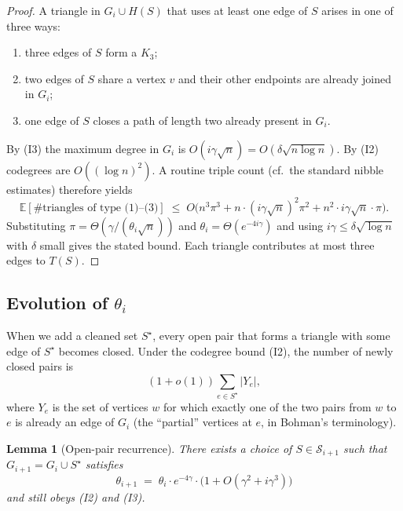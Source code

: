 \documentclass[11pt]{article}
\newtheorem{lemma}[theorem]{Lemma}
\theoremstyle{definition}
\begin{document}
\begin{proof}
A triangle in $G_i\cup H(S)$ that uses at least one edge of $S$ arises in one of three ways:
\begin{enumerate}
  \item three edges of $S$ form a $K_3$;
  \item two edges of $S$ share a vertex $v$ and their other endpoints are already joined in $G_i$;
  \item one edge of $S$ closes a path of length two already present in $G_i$.
\end{enumerate}
By (I3) the maximum degree in $G_i$ is $O(i\gamma\sqrt{n})=O(\delta\sqrt{n\log n})$.
By (I2) codegrees are $O((\log n)^{2})$.
A routine triple count (cf.\ the standard nibble estimates) therefore yields
\[
  \mathbb{E}[\text{\# triangles of type (1)--(3)}]
  \;\le\;
  O\bigl( n^{3}\pi^{3} + n\cdot (i\gamma\sqrt{n})^{2}\pi^{2} + n^{2}\cdot i\gamma\sqrt{n}\cdot\pi \bigr).
\]
Substituting $\pi=\Theta(\gamma/(\theta_i\sqrt{n}))$ and $\theta_i=\Theta(e^{-4i\gamma})$ and using $i\gamma\le\delta\sqrt{\log n}$ with $\delta$ small gives the stated bound.
Each triangle contributes at most three edges to $T(S)$.
\end{proof}

\subsection{Evolution of $\theta_i$}

When we add a cleaned set $S^\star$, every open pair that forms a triangle with some edge of $S^\star$ becomes closed.
Under the codegree bound (I2), the number of newly closed pairs is
\[
  (1+o(1))\sum_{e\in S^\star} |Y_e|,
\]
where $Y_e$ is the set of vertices $w$ for which exactly one of the two pairs from $w$ to $e$ is already an edge of $G_i$ (the ``partial'' vertices at $e$, in Bohman's terminology).

\begin{lemma}[Open-pair recurrence]\label{lem:theta}
There exists a choice of $S\in\mathcal{S}_{i+1}$ such that $G_{i+1}=G_i\cup S^\star$ satisfies
\[
  \theta_{i+1}
  \;=\;
  \theta_i\cdot e^{-4\gamma}\cdot\bigl(1+O(\gamma^{2}+i\gamma^{3})\bigr)
\]
and still obeys (I2) and (I3).
\end{lemma}
\end{document}
